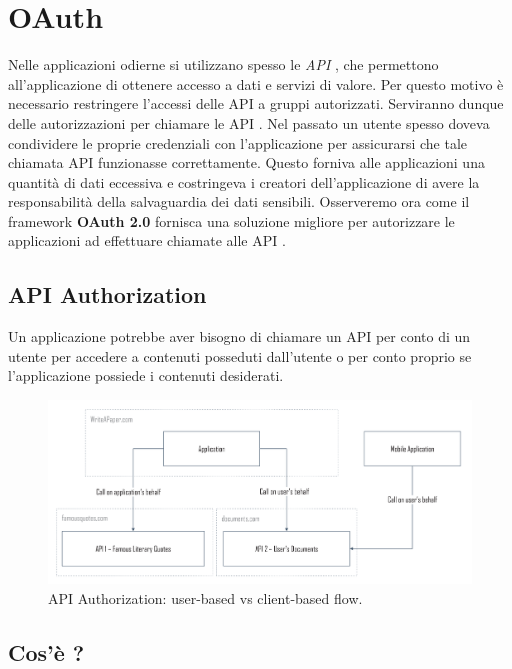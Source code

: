 \newcommand{\api}{API \emoji{bee}}

\chapter{OAuth}

Nelle applicazioni odierne si utilizzano spesso le \textit{API} , che permettono
all'applicazione di ottenere accesso a dati e servizi di valore. Per questo motivo
è necessario restringere l'accessi delle \api{} a gruppi autorizzati. Serviranno dunque
delle autorizzazioni per chiamare le \api{}. Nel passato un utente spesso doveva condividere
le proprie credenziali con l'applicazione per assicurarsi che tale chiamata \api{}
funzionasse correttamente. Questo forniva alle applicazioni una quantità di dati
eccessiva e costringeva i creatori dell'applicazione di avere la responsabilità
della salvaguardia dei dati sensibili. Osserveremo ora come il framework
\textbf{OAuth 2.0} fornisca una soluzione migliore per autorizzare le applicazioni
ad effettuare chiamate alle \api{}.

\section{API Authorization}

Un applicazione potrebbe aver bisogno di chiamare un \api{} per conto di un utente
per accedere a contenuti posseduti dall'utente o per conto proprio se l'applicazione
possiede i contenuti desiderati.

\begin{figure}[H]
      \centering
      \includegraphics[width=\textwidth, keepaspectratio]{capitoli/id_managing/imgs/api1.png}
      \caption{\api{} Authorization: user-based vs client-based flow.}
\end{figure}

\section{Cos'è ?}

